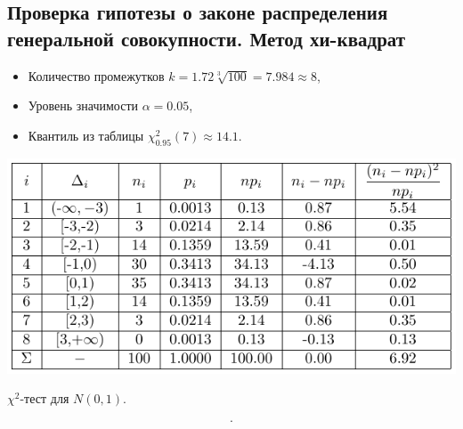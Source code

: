 \documentclass[a4paper]{article}
\begin{document}
\subsection{Проверка гипотезы о законе распределения генеральной совокупности. Метод хи-квадрат}
\begin{itemize}
    \item Количество промежутков $k=1.72\sqrt[3]{100}=7.984\approx8$,
    \item Уровень значимости $\alpha=0.05$,
    \item Квантиль из таблицы $\chi^2_{0.95}(7)\approx 14.1$.
\end{itemize}
\begin{table}[H]
    \centering
    \includegraphics[]{LabSrcs/resources/chi2test.pdf}
    \caption{$\chi^2$-тест для $N(0,1)$.}
    \label{tab:chi2test}
\end{table}
\begin{equation*}
    .
\end{equation*}
\end{document}
